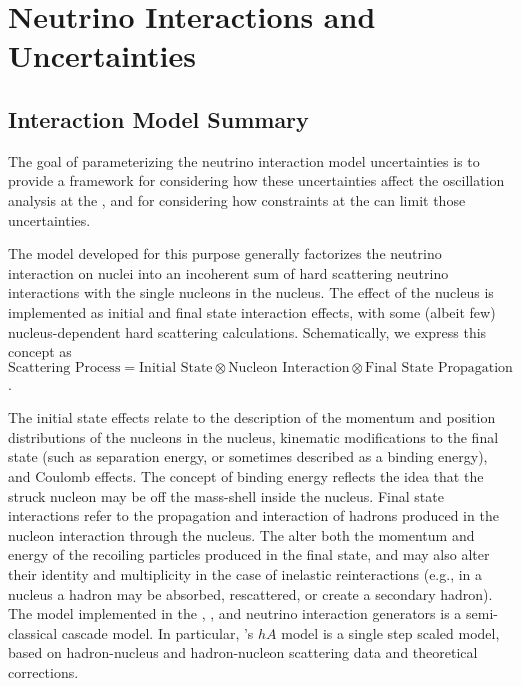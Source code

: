 \section{Neutrino Interactions and Uncertainties}\label{sec:nu-osc-05} %


\subsection{Interaction Model Summary}


The goal of parameterizing the neutrino interaction model uncertainties is to provide a framework for considering how these uncertainties affect the oscillation analysis at the , and for considering how constraints at the  can limit those uncertainties.
 
The model developed for this purpose generally factorizes the neutrino interaction on nuclei into an incoherent sum of hard scattering neutrino interactions with the single nucleons in the nucleus. The effect of the nucleus is implemented as initial and final state interaction effects, with some (albeit few) nucleus-dependent hard scattering calculations. Schematically, we express this concept as $\text{Scattering Process} = \text{Initial State} \otimes \text{Nucleon Interaction} \otimes \text{Final State Propagation}$.

The initial state effects relate to the description of the momentum and position distributions of the nucleons in the nucleus, kinematic modifications to the final state (such as separation energy, or sometimes described as a binding energy), and Coulomb effects.   The concept of binding energy reflects the idea that the struck nucleon may be off the mass-shell inside the nucleus.
Final state interactions refer to the propagation and interaction of hadrons produced in the nucleon interaction through the nucleus. The  alter both the momentum and energy of the recoiling particles produced in the final state, and may also alter their identity and multiplicity in the case of inelastic reinteractions (e.g., in a nucleus a hadron may be absorbed, rescattered, or create a secondary hadron).  The  model implemented in the , , and  neutrino interaction generators is a semi-classical cascade model. In particular, 's $hA$ model is a single step scaled model, based on hadron-nucleus and hadron-nucleon scattering data and theoretical corrections. %


